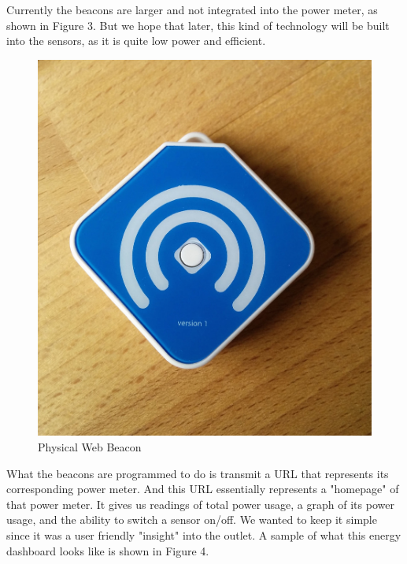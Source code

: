 \documentclass{sig-alternate-05-2015}
\begin{document}
Currently the beacons are larger and not integrated into the power meter, as shown in Figure 3. But we hope that later, this kind of technology will be built into the sensors, as it is quite low power and efficient.

\begin{figure}
	\centering
	\includegraphics[scale=.1]{phys}
	\caption{Physical Web Beacon}
\end{figure}

What the beacons are programmed to do is transmit a URL that represents its corresponding power meter. And this URL essentially represents a "homepage" of that power meter. It gives us readings of total power usage, a graph of its power usage, and the ability to switch a sensor on/off. We wanted to keep it simple since it was a user friendly "insight" into the outlet. A sample of what this energy dashboard looks like is shown in Figure 4.
\end{document}
